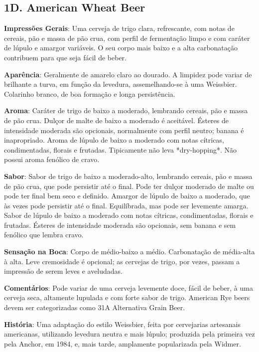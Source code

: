 \subsection*{1D. American Wheat Beer}

\textbf{Impressões Gerais}: Uma cerveja de trigo clara, refrescante, com notas de cereais, pão e massa de pão crua, com perfil de fermentação limpo e com caráter de lúpulo e amargor variáveis. O seu corpo mais baixo e a alta carbonatação contribuem para que seja fácil de beber.

\textbf{Aparência}: Geralmente de amarelo claro ao dourado. A limpidez pode variar de brilhante a turva, em função da levedura, assemelhando-se à uma Weissbier. Colarinho branco, de boa formação e longa persistência.

\textbf{Aroma}: Caráter de trigo de baixo a moderado, lembrando cereais, pão e massa de pão crua. Dulçor de malte de baixo a moderado é aceitável. Ésteres de intensidade moderada são opcionais, normalmente com perfil neutro; banana é inapropriado. Aroma de lúpulo de baixo a moderado com notas cítricas, condimentadas, florais e frutadas. Tipicamente não leva *dry-hopping*. Não possui aroma fenólico de cravo.

\textbf{Sabor}: Sabor de trigo de baixo a moderado-alto, lembrando cereais, pão e massa de pão crua, que pode persistir até o final. Pode ter dulçor moderado de malte ou pode ter final bem seco e definido. Amargor de lúpulo de baixo a moderado, que às vezes pode persistir até o final. Equilíbrada, mas pode ser levemente amarga. Sabor de lúpulo de baixo a moderado com notas cítricas, condimentadas, florais e frutadas. Ésteres de intensidade moderada são opcionais, sem banana e sem fenólico que lembra cravo.

\textbf{Sensação na Boca}: Corpo de médio-baixo a médio. Carbonatação de média-alta à alta. Leve cremosidade é opcional; as cervejas de trigo, por vezes, passam a impressão de serem leves e aveludadas.

\textbf{Comentários}: Pode variar de uma cerveja levemente doce, fácil de beber, à uma cerveja seca, altamente lupulada e com forte sabor de trigo. American Rye beers devem ser categorizadas como 31A Alternativa Grain Beer.

\textbf{História}: Uma adaptação do estilo Weissbier, feita por cervejarias artesanais americanas, utilizando levedura neutra e mais lúpulo; produzida pela primeira vez pela Anchor, em 1984, e, mais tarde, amplamente popularizada pela Widmer.

